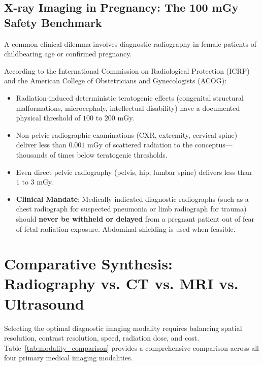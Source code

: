 \documentclass[11pt,a4paper]{article}
\begin{document}
\subsection{X-ray Imaging in Pregnancy: The 100 mGy Safety Benchmark}
A common clinical dilemma involves diagnostic radiography in female patients of childbearing age or confirmed pregnancy. 
\begin{radiationsafety}
According to the International Commission on Radiological Protection (ICRP) and the American College of Obstetricians and Gynecologists (ACOG):
\begin{itemize}
    \item Radiation-induced deterministic teratogenic effects (congenital structural malformations, microcephaly, intellectual disability) have a documented physical threshold of \textbf{$100\text{ to }200\text{ mGy}$}.
    \item Non-pelvic radiographic examinations (CXR, extremity, cervical spine) deliver less than \textbf{$0.001\text{ mGy}$} of scattered radiation to the conceptus—thousands of times below teratogenic thresholds.
    \item Even direct pelvic radiography (pelvis, hip, lumbar spine) delivers less than \textbf{$1\text{ to }3\text{ mGy}$}.
    \item \textbf{Clinical Mandate}: Medically indicated diagnostic radiographs (such as a chest radiograph for suspected pneumonia or limb radiograph for trauma) should \textbf{never be withheld or delayed} from a pregnant patient out of fear of fetal radiation exposure. Abdominal shielding is used when feasible.
\end{itemize}
\end{radiationsafety}

\section{Comparative Synthesis: Radiography vs. CT vs. MRI vs. Ultrasound}

Selecting the optimal diagnostic imaging modality requires balancing spatial resolution, contrast resolution, speed, radiation dose, and cost. Table~\ref{tab:modality_comparison} provides a comprehensive comparison across all four primary medical imaging modalities.
\end{document}
